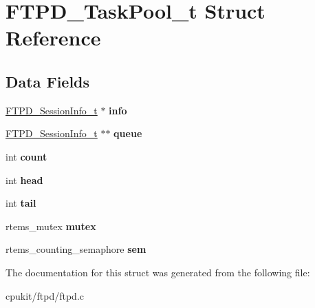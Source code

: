 \hypertarget{structFTPD__TaskPool__t}{}\section{F\+T\+P\+D\+\_\+\+Task\+Pool\+\_\+t Struct Reference}
\label{structFTPD__TaskPool__t}
\subsection*{Data Fields}
\begin{DoxyCompactItemize}
\item 
\mbox{\label{structFTPD__TaskPool__t_a84168384ded7f8716896bc6bc266314f}} 
\mbox{\hyperlink{structFTPD__SessionInfo__t}{F\+T\+P\+D\+\_\+\+Session\+Info\+\_\+t}} $\ast$ {\bfseries info}
\item 
\mbox{\label{structFTPD__TaskPool__t_a1f8ac736e105d979145c459f919b3eaf}} 
\mbox{\hyperlink{structFTPD__SessionInfo__t}{F\+T\+P\+D\+\_\+\+Session\+Info\+\_\+t}} $\ast$$\ast$ {\bfseries queue}
\item 
\mbox{\label{structFTPD__TaskPool__t_ab4fe88e9d2aca97850110311d8833ae3}} 
int {\bfseries count}
\item 
\mbox{\label{structFTPD__TaskPool__t_a181f325b20091216631bc281cb267505}} 
int {\bfseries head}
\item 
\mbox{\label{structFTPD__TaskPool__t_a916679705aab907078c6290a5985a013}} 
int {\bfseries tail}
\item 
\mbox{\label{structFTPD__TaskPool__t_a6aba7abf36ebc03089d7086f889a5bb4}} 
rtems\+\_\+mutex {\bfseries mutex}
\item 
\mbox{\label{structFTPD__TaskPool__t_a943257d99d7d599aa736ee316df675ed}} 
rtems\+\_\+counting\+\_\+semaphore {\bfseries sem}
\end{DoxyCompactItemize}


The documentation for this struct was generated from the following file\+:\begin{DoxyCompactItemize}
\item 
cpukit/ftpd/ftpd.\+c\end{DoxyCompactItemize}
